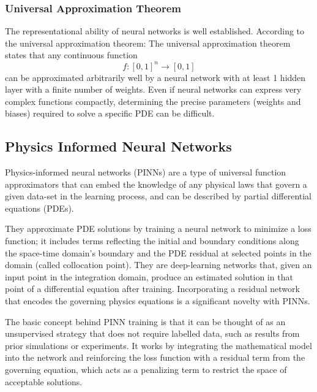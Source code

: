 \documentclass{article}
\begin{document}
\subsubsection{Universal Approximation Theorem}

The representational ability of neural networks is well established. According to the universal approximation theorem:
The universal approximation theorem states that any continuous function  $$f : [0, 1]^{n} \rightarrow [0, 1]$$  can be approximated arbitrarily well by a neural network with at least 1 hidden layer with a finite number of weights.
Even if neural networks can express very complex functions compactly, determining the precise parameters (weights and biases) required to solve a specific PDE can be difficult.


\subsection{Physics Informed Neural Networks}

Physics-informed neural networks (PINNs) are a type of universal function approximators that can embed the knowledge of any physical laws that govern a given data-set in the learning process, and can be described by partial differential equations (PDEs).

They approximate PDE solutions by training a neural network to minimize a loss function; it includes terms reflecting the initial and boundary conditions along the space-time domain’s boundary and the PDE residual at selected points in the domain (called collocation point). 
They are deep-learning networks that, given an input point in the integration domain, produce an estimated solution in that point of a differential equation after training. Incorporating a residual network that encodes the governing physics equations is a significant novelty with PINNs. 

The basic concept behind PINN training is that it can be thought of as an unsupervised strategy that does not require labelled data, such as results from prior simulations or experiments.
It works by integrating the mathematical model into the network and reinforcing the loss function with a residual term from the governing equation, which acts as a penalizing term to restrict the space of acceptable solutions.

\end{document}
